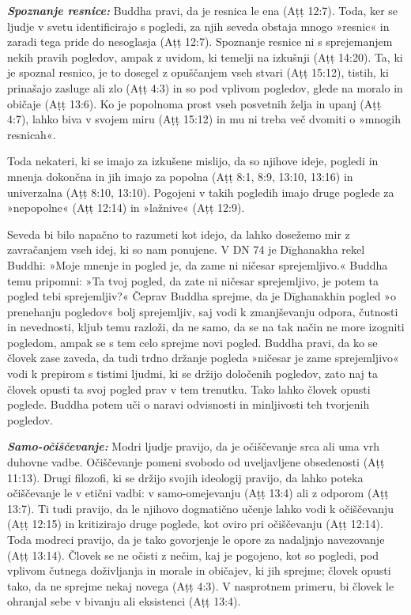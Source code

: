 \textbf{\emph{Spoznanje resnice:} }Buddha pravi, da je resnica le ena
(Aṭṭ 12:7). Toda, ker se ljudje v svetu identificirajo s pogledi, za
njih seveda obstaja mnogo »resnic« in zaradi tega pride do nesoglasja
(Aṭṭ 12:7). Spoznanje resnice ni s sprejemanjem nekih pravih pogledov,
ampak z uvidom, ki temelji na izkušnji (Aṭṭ 14:20). Ta, ki je spoznal
resnico, je to dosegel z opuščanjem vseh stvari (Aṭṭ 15:12), tistih, ki
prinašajo zasluge ali zlo (Aṭṭ 4:3) in so pod vplivom pogledov, glede na
moralo in običaje (Aṭṭ 13:6). Ko je popolnoma prost vseh posvetnih želja
in upanj (Aṭṭ 4:7), lahko biva v svojem miru (Aṭṭ 15:12) in mu ni treba
več dvomiti o »mnogih resnicah«.

Toda nekateri, ki se imajo za izkušene mislijo, da so njihove ideje,
pogledi in mnenja dokončna in jih imajo za popolna (Aṭṭ 8:1, 8:9, 13:10,
13:16) in univerzalna (Aṭṭ 8:10, 13:10). Pogojeni v takih pogledih imajo
druge poglede za »nepopolne« (Aṭṭ 12:14) in »lažnive« (Aṭṭ 12:9).

Seveda bi bilo napačno to razumeti kot idejo, da lahko dosežemo mir z
zavračanjem vseh idej, ki so nam ponujene. V DN 74 je Dīghanakha rekel
Buddhi: »Moje mnenje in pogled je, da zame ni ničesar sprejemljivo.«
Buddha temu pripomni: »Ta tvoj pogled, da zate ni ničesar sprejemljivo,
je potem ta pogled tebi sprejemljiv?« Čeprav Buddha sprejme, da je
Dīghanakhin pogled »o prenehanju pogledov« bolj sprejemljiv, saj vodi k
zmanjševanju odpora, čutnosti in nevednosti, kljub temu razloži, da ne
samo, da se na tak način ne more izogniti pogledom, ampak se s tem celo
sprejme novi pogled. Buddha pravi, da ko se človek zase zaveda, da tudi
trdno držanje pogleda »ničesar je zame sprejemljivo« vodi k prepirom s
tistimi ljudmi, ki se držijo določenih pogledov, zato naj ta človek
opusti ta svoj pogled prav v tem trenutku. Tako lahko človek opusti
poglede. Buddha potem uči o naravi odvisnosti in minljivosti teh
tvorjenih pogledov.

\textbf{\emph{Samo-očiščevanje:} }Modri ljudje pravijo, da je
očiščevanje srca ali uma vrh duhovne vadbe. Očiščevanje pomeni svobodo
od uveljavljene obsedenosti (Aṭṭ 11:13). Drugi filozofi, ki se držijo
svojih ideologij pravijo, da lahko poteka očiščevanje le v etični vadbi:
v samo-omejevanju (Aṭṭ 13:4) ali z odporom (Aṭṭ 13:7). Ti tudi pravijo,
da le njihovo dogmatično učenje lahko vodi k očiščevanju (Aṭṭ 12:15) in
kritizirajo druge poglede, kot oviro pri očiščevanju (Aṭṭ 12:14). Toda
modreci pravijo, da je tako govorjenje le opore za nadaljnjo navezovanje
(Aṭṭ 13:14). Človek se ne očisti z nečim, kaj je pogojeno, kot so
pogledi, pod vplivom čutnega doživljanja in morale in običajev, ki jih
sprejme; človek opusti tako, da ne sprejme nekaj novega (Aṭṭ 4:3). V
nasprotnem primeru, bi človek le ohranjal sebe v bivanju ali eksistenci
(Aṭṭ 13:4).

